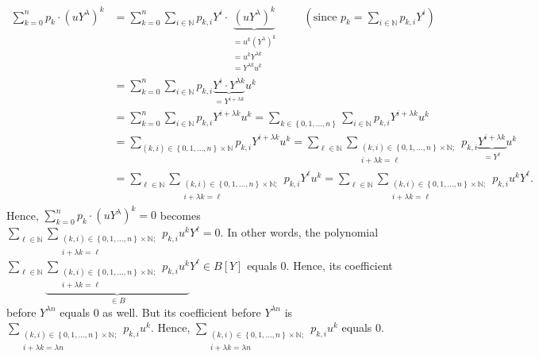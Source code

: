 \documentclass[12pt,final,notitlepage,onecolumn]{article}%
\begin{document}
\begin{align*}
\sum\limits_{k=0}^{n}p_{k}\cdot\left(  uY^{\lambda}\right)  ^{k}  &
=\sum\limits_{k=0}^{n}\sum\limits_{i\in\mathbb{N}}p_{k,i}Y^{i}\cdot
\underbrace{\left(  uY^{\lambda}\right)  ^{k}}_{\substack{=u^{k}\left(
Y^{\lambda}\right)  ^{k}\\=u^{k}Y^{\lambda k}\\=Y^{\lambda k}u^{k}%
}}\ \ \ \ \ \ \ \ \ \ \left(  \text{since }p_{k}=\sum\limits_{i\in\mathbb{N}%
}p_{k,i}Y^{i}\right) \\
&  =\sum\limits_{k=0}^{n}\sum\limits_{i\in\mathbb{N}}p_{k,i}\underbrace{Y^{i}%
\cdot Y^{\lambda k}}_{=Y^{i+\lambda k}}u^{k}\\
&  =\sum\limits_{k=0}^{n}\sum\limits_{i\in\mathbb{N}}p_{k,i}Y^{i+\lambda
k}u^{k}=\sum\limits_{k\in\left\{  0,1,...,n\right\}  }\sum\limits_{i\in
\mathbb{N}}p_{k,i}Y^{i+\lambda k}u^{k}\\
&  =\sum\limits_{\left(  k,i\right)  \in\left\{  0,1,...,n\right\}
\times\mathbb{N}}p_{k,i}Y^{i+\lambda k}u^{k}=\sum_{\ell\in\mathbb{N}}%
\sum\limits_{\substack{\left(  k,i\right)  \in\left\{  0,1,...,n\right\}
\times\mathbb{N};\\i+\lambda k=\ell}}p_{k,i}\underbrace{Y^{i+\lambda k}%
}_{=Y^{\ell}}u^{k}\\
&  =\sum_{\ell\in\mathbb{N}}\sum\limits_{\substack{\left(  k,i\right)
\in\left\{  0,1,...,n\right\}  \times\mathbb{N};\\i+\lambda k=\ell}%
}p_{k,i}Y^{\ell}u^{k}=\sum_{\ell\in\mathbb{N}}\sum\limits_{\substack{\left(
k,i\right)  \in\left\{  0,1,...,n\right\}  \times\mathbb{N};\\i+\lambda
k=\ell}}p_{k,i}u^{k}Y^{\ell}.
\end{align*}
Hence, $\sum\limits_{k=0}^{n}p_{k}\cdot\left(  uY^{\lambda}\right)  ^{k}=0$
becomes $\sum\limits_{\ell\in\mathbb{N}}\sum\limits_{\substack{\left(
k,i\right)  \in\left\{  0,1,...,n\right\}  \times\mathbb{N};\\i+\lambda
k=\ell}}p_{k,i}u^{k}Y^{\ell}=0$. In other words, the polynomial $\sum
\limits_{\ell\in\mathbb{N}}\underbrace{\sum\limits_{\substack{\left(
k,i\right)  \in\left\{  0,1,...,n\right\}  \times\mathbb{N};\\i+\lambda
k=\ell}}p_{k,i}u^{k}}_{\in B}Y^{\ell}\in B\left[  Y\right]  $ equals $0$.
Hence, its coefficient before $Y^{\lambda n}$ equals $0$ as well. But its
coefficient before $Y^{\lambda n}$ is $\sum\limits_{\substack{\left(
k,i\right)  \in\left\{  0,1,...,n\right\}  \times\mathbb{N};\\i+\lambda
k=\lambda n}}p_{k,i}u^{k}$. Hence, $\sum\limits_{\substack{\left(  k,i\right)
\in\left\{  0,1,...,n\right\}  \times\mathbb{N};\\i+\lambda k=\lambda
n}}p_{k,i}u^{k}$ equals $0$.
\end{document}
